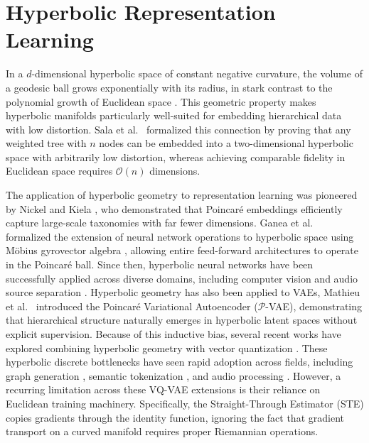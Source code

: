 \documentclass[12pt]{report}
\begin{document}
\section{Hyperbolic Representation Learning}
\label{sec:hyperbolic_repr}

 In a $d$-dimensional hyperbolic space of constant negative curvature, the volume of a geodesic ball grows exponentially with its radius, in stark contrast to the polynomial growth of Euclidean space \cite{cannon1997hyperbolic}. This geometric property makes hyperbolic manifolds particularly well-suited for embedding hierarchical data with low distortion. Sala et al.\ \cite{sala2018representation} formalized this connection by proving that any weighted tree with $n$ nodes can be embedded into a two-dimensional hyperbolic space with arbitrarily low distortion, whereas achieving comparable fidelity in Euclidean space requires $\mathcal{O}(n)$ dimensions.

The application of hyperbolic geometry to representation learning was pioneered by Nickel and Kiela \cite{nickel2017poincare}, who demonstrated that Poincar\'e embeddings efficiently capture large-scale taxonomies with far fewer dimensions. Ganea et al.\ \cite{ganea2018hyperbolic} formalized the extension of neural network operations to hyperbolic space using M\"obius gyrovector algebra \cite{ungar2009gyrovector}, allowing entire feed-forward architectures to operate in the Poincar\'e ball. Since then, hyperbolic neural networks have been successfully applied across diverse domains, including computer vision \cite{khrulkov2020hyperbolic, atigh2022hyperbolic, mettes2024hyperbolic} and audio source separation \cite{petermann2023hyperbolic}. Hyperbolic geometry has also been applied to VAEs, Mathieu et al.\ \cite{mathieu2019poincare} introduced the Poincar\'e Variational Autoencoder ($\mathcal{P}$-VAE), demonstrating that hierarchical structure naturally emerges in hyperbolic latent spaces without explicit supervision. Because of this inductive bias, several recent works have explored combining hyperbolic geometry with vector quantization \cite{hypervq, hvqvae}. These hyperbolic discrete bottlenecks have seen rapid adoption across fields, including graph generation \cite{bu2025ggball}, semantic tokenization \cite{yao2026zeroshot, wang2026varlenrec}, and audio processing \cite{girish2026prosody}. However, a recurring limitation across these VQ-VAE extensions is their reliance on Euclidean training machinery. Specifically, the Straight-Through Estimator (STE) copies gradients through the identity function, ignoring the fact that gradient transport on a curved manifold requires proper Riemannian operations.
\end{document}
